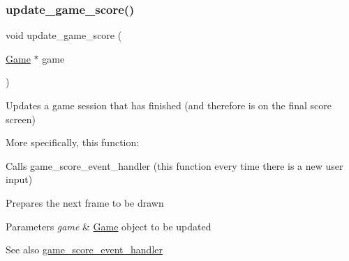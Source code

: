 \subsubsection{\texorpdfstring{update\+\_\+game\+\_\+score()}{update\_game\_score()}}
{\footnotesize\ttfamily void update\+\_\+game\+\_\+score (\begin{DoxyParamCaption}\item[{\hyperlink{struct_game}{Game} $\ast$}]{game }\end{DoxyParamCaption})}



Updates a game session that has finished (and therefore is on the final score screen) 

More specifically, this function\+:
\begin{DoxyItemize}
\item Calls game\+\_\+score\+\_\+event\+\_\+handler (this function every time there is a new user input)
\item Prepares the next frame to be drawn
\end{DoxyItemize}


\begin{DoxyParams}{Parameters}
{\em game} & \hyperlink{struct_game}{Game} \textquotesingle{}object\textquotesingle{} to be updated \\
\hline
\end{DoxyParams}
\begin{DoxySeeAlso}{See also}
\hyperlink{group__game_gaae19b3df5cdf51786306772dc362cc78}{game\+\_\+score\+\_\+event\+\_\+handler} 
\end{DoxySeeAlso}
